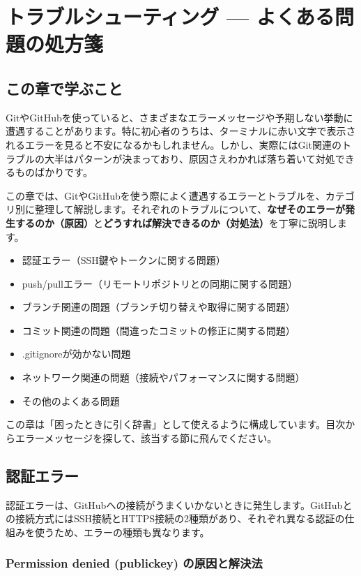 \chapter{トラブルシューティング --- よくある問題の処方箋}

\section{この章で学ぶこと}

GitやGitHubを使っていると、さまざまなエラーメッセージや予期しない挙動に遭遇することがあります。特に初心者のうちは、ターミナルに赤い文字で表示されるエラーを見ると不安になるかもしれません。しかし、実際にはGit関連のトラブルの大半はパターンが決まっており、原因さえわかれば落ち着いて対処できるものばかりです。

この章では、GitやGitHubを使う際によく遭遇するエラーとトラブルを、カテゴリ別に整理して解説します。それぞれのトラブルについて、\textbf{なぜそのエラーが発生するのか（原因）}と\textbf{どうすれば解決できるのか（対処法）}を丁寧に説明します。

\begin{itemize}
  \item 認証エラー（SSH鍵やトークンに関する問題）
  \item push/pullエラー（リモートリポジトリとの同期に関する問題）
  \item ブランチ関連の問題（ブランチ切り替えや取得に関する問題）
  \item コミット関連の問題（間違ったコミットの修正に関する問題）
  \item .gitignoreが効かない問題
  \item ネットワーク関連の問題（接続やパフォーマンスに関する問題）
  \item その他のよくある問題
\end{itemize}

この章は「困ったときに引く辞書」として使えるように構成しています。目次からエラーメッセージを探して、該当する節に飛んでください。

\section{認証エラー}

認証エラーは、GitHubへの接続がうまくいかないときに発生します。GitHubとの接続方式にはSSH接続とHTTPS接続の2種類があり、それぞれ異なる認証の仕組みを使うため、エラーの種類も異なります。

\subsection{Permission denied (publickey) の原因と解決法}

